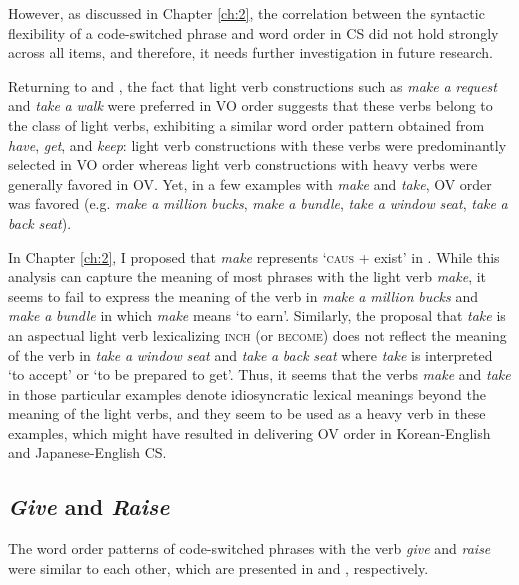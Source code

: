 However, as discussed in Chapter \ref{ch:2}, the correlation between the syntactic flexibility of a code-switched phrase and word order in \ac{CS} did not hold strongly across all items, and therefore, it needs further investigation in future research. 

Returning to  and , the fact that light verb constructions such as \textit{make} \textit{a} \textit{request} and \textit{take} \textit{a} \textit{walk} were preferred in \ac{VO} order suggests that these verbs belong to the class of light verbs, exhibiting a similar word order pattern obtained from \textit{have}, \textit{get}, and \textit{keep}: light verb constructions with these verbs were predominantly selected in \ac{VO} order whereas light verb constructions with heavy verbs were generally favored in \ac{OV}. Yet, in a few examples with \textit{make} and \textit{take}, \ac{OV} order was favored (e.g. \textit{make} \textit{a} \textit{million} \textit{bucks}, \textit{make} \textit{a} \textit{bundle}, \textit{take} \textit{a} \textit{window} \textit{seat}, \textit{take} \textit{a} \textit{back} \textit{seat}). 

In Chapter \ref{ch:2}, I proposed that \textit{make} represents ‘\textsc{caus} + exist’ in . While this analysis can capture the meaning of most phrases with the light verb \textit{make}, it seems to fail to express the meaning of the verb in \textit{make} \textit{a} \textit{million} \textit{bucks} and \textit{make} \textit{a} \textit{bundle} in which \textit{make} means ‘to earn’. Similarly, the proposal that \textit{take} is an aspectual light verb lexicalizing \textsc{inch} (or \textsc{become}) does not reflect the meaning of the verb in \textit{take} \textit{a} \textit{window} \textit{seat} and \textit{take} \textit{a} \textit{back} \textit{seat} where \textit{take} is interpreted ‘to accept’ or ‘to be prepared to get’. Thus, it seems that the verbs \textit{make} and \textit{take} in those particular examples denote idiosyncratic lexical meanings beyond the meaning of the light verbs, and they seem to be used as a heavy verb in these examples, which might have resulted in delivering \ac{OV} order in Korean-English and Japanese-English \ac{CS}.

\subsection{\textit{Give} and \textit{Raise}}\label{ch5:sect:5.7.6}

The word order patterns of code-switched phrases with the verb \textit{give} and \textit{raise} were similar to each other, which are presented in  and , respectively.

